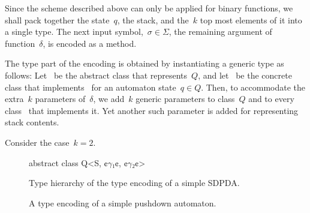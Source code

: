 Since the scheme described above can only be applied for binary functions,
  we shall pack together the state~$q$, the stack, and the~$k$ top most
  elements of it into a single type.
The next input symbol,~$σ∈Σ$, the remaining argument of function~$δ$,
  is encoded as a method.

The type part of the encoding is obtained by instantiating a generic type as follows:
Let~ be the abstract class that represents~$Q$, and let~ be the concrete class that
  implements~ for an automaton state~$q∈Q$.
Then, to accommodate the extra~$k$ parameters of~$δ$, we add~$k$ generic parameters
  to class~$Q$ and to every class~ that implements it.
Yet another such parameter is added for representing stack contents.

Consider the case~$k=2$.
\begin{figure}
  \begin{JAVA}
abstract class Q<S, ¢$γ₁$¢, ¢$γ₂$¢>
  \end{JAVA}
\end{figure}

\begin{figure}
  \caption{\label{Figure:SDPDA:hierarchy}%
    Type hierarchy of the type encoding of a simple SDPDA.
  }
  \begin{adjustbox}{}
    
  \end{adjustbox}
\end{figure}

\begin{figure}
  \caption{\label{Figure:SDPDA:example}%
    A type encoding of a simple pushdown automaton.
  }
\end{figure}
